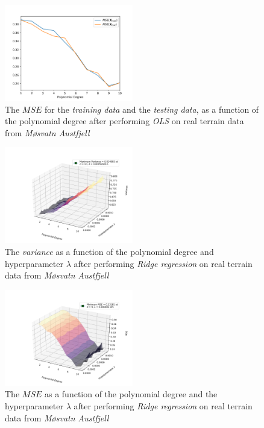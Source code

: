 \documentclass[a4paper,10pt,english]{article}
\begin{document}
\begin{figure}[H]
	\centering 
	\includegraphics[width = 0.5\textwidth, center]{../real_output/part_C_2.png}
	\caption{The $MSE$ for the \textit{training data} and the \textit{testing data}, as a function of the polynomial degree after performing \textit{OLS} on real terrain data from \textit{Møsvatn Austfjell}}
	\label{part_g_c2}
\end{figure}

\begin{figure}[H]
	\centering 
	\includegraphics[width = 0.5\textwidth, center]{../real_output/part_D_1.png}
	\caption{The \textit{variance} as a function of the polynomial degree and hyperparameter $\lambda$ after performing \textit{Ridge regression} on real terrain data from \textit{Møsvatn Austfjell}}
	\label{part_g_d1}
\end{figure}

\begin{figure}[H]
	\centering 
	\includegraphics[width = 0.5\textwidth, center]{../real_output/part_D_2.png}
	\caption{The $MSE$ as a function of the polynomial degree and the hyperparameter $\lambda$ after performing \textit{Ridge regression} on real terrain data from \textit{Møsvatn Austfjell}}
	\label{part_g_d2}
\end{figure}
\end{document}

